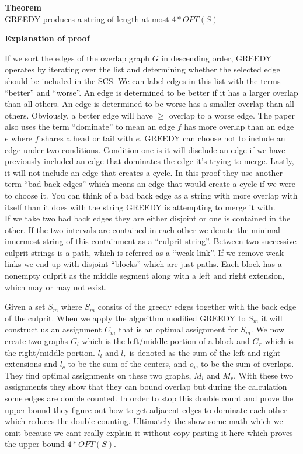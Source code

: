 \documentclass[letterpaper,11pt,titlepage]{article}
\begin{document}
\textbf{Theorem}\\
GREEDY produces a string of length at most $4 * OPT(S)$

\textbf{Explanation of proof}

If we sort the edges of the overlap graph $G$ in descending order, GREEDY operates by iterating over the list and determining whether the selected edge should be included in the SCS. We can label edges in this list with the terms ``better'' and ``worse''. An edge is determined to be better if it has a larger overlap than all others. An edge is determined to be worse has a smaller overlap than all others. Obviously, a better edge will have $\geq$ overlap to a worse edge. The paper also uses the term ``dominate'' to mean an edge $f$ has more overlap than an edge $e$ where $f$ shares a head or tail with $e$. GREEDY can choose not to include an edge under two conditions. Condition one is it will disclude an edge if we have previously included an edge that dominates the edge it's trying to merge. Lastly, it will not include an edge that creates a cycle. In this proof they use another term ``bad back edges'' which means an edge that would create a cycle if we were to choose it. You can think of a bad back edge as a string with more overlap with itself than it does with the string GREEDY is attempting to merge it with.\\

If we take two bad back edges they are either disjoint or one is contained in the other. If the two intervals are contained in each other we denote the minimal innermost string of this containment as a ``culprit string''. Between two successive culprit strings is a path, which is referred as a ``weak link''. If we remove weak links we end up with disjoint ``blocks'' which are just paths. Each block has a nonempty culprit as the middle segment along with a left and right extension, which may or may not exist.

Given a set $S_m$ where $S_m$ consits of the greedy edges together with the back edge of the culprit. When we apply the algorithm modified GREEDY to $S_m$ it will construct us an assignment $C_m$ that is an optimal assignment for $S_m$. We now create two graphs $G_l$ which is the left/middle portion of a block and $G_r$ which is the right/middle portion. $l_l$ and $l_r$ is denoted as the sum of the left and right extensions and $l_c$ to be the sum of the centers, and $o_w$ to be the sum of overlaps. They find optimal assignments on these two graphs, $M_l$ and $M_r$. With these two assignments they show that they can bound overlap but during the calculation some edges are double counted. In order to stop this double count and prove the upper bound they figure out how to get adjacent edges to dominate each other which reduces the double counting. Ultimately the show some math which we omit because we cant really explain it without copy pasting it here which proves the upper bound $4 * OPT(S)$.
\end{document}
